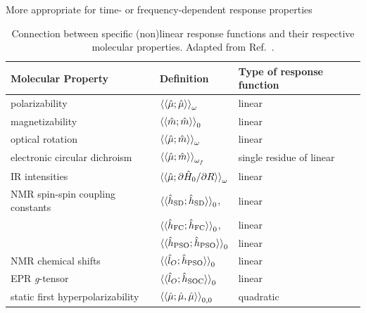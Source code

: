 \documentclass[%
class = book,%
crop = false,%
float = true,%
multi = true,%
preview = false,%
]{standalone}
\begin{document}
More appropriate for time- or frequency-dependent response properties

\begin{table}
  \centering
  \caption[Connection between specific response functions and their respective molecular properties]{Connection between specific (non)linear response functions and their respective molecular properties. Adapted from Ref.~\parencite{C1CP21951K}.\label{tab:norman}}
  \begin{tabular}{lll}
    \toprule
    \textbf{Molecular Property}       & \textbf{Definition}                                                                    & \textbf{Type of response function} \\
    \midrule
    polarizability                    & \( \braket{\braket{\hat{\mu};\hat{\mu}}}_{\omega} \)                                   & linear \\
    magnetizability                   & \( \braket{\braket{\hat{m};\hat{m}}}_{0} \)                                            & linear \\
    optical rotation                  & \( \braket{\braket{\hat{\mu};\hat{m}}}_{\omega} \)                                     & linear \\
    electronic circular dichroism     & \( \braket{\braket{\hat{\mu};\hat{m}}}_{\omega_{f}} \)                                 & single residue of linear \\
    IR intensities                    & \( \braket{\braket{\hat{\mu};\partial\hat{H}_{0}/\partial R}}_{\omega} \)              & linear \\
    NMR spin-spin coupling constants  & \( \braket{\braket{\hat{h}_{\text{SD}};\hat{h}_{\text{SD}}}}_{0} \),                   & linear \\
                                      & \( \braket{\braket{\hat{h}_{\text{FC}};\hat{h}_{\text{FC}}}}_{0} \),                   & linear \\
                                      & \( \braket{\braket{\hat{h}_{\text{PSO}};\hat{h}_{\text{PSO}}}}_{0} \)                  & linear \\
    NMR chemical shifts               & \( \braket{\braket{\hat{l}_{O};\hat{h}_{\text{PSO}}}}_{0} \)                           & linear \\
    EPR \textit{g}-tensor             & \( \braket{\braket{\hat{l}_{O};\hat{h}_{\text{SOC}}}}_{0} \)                           & linear \\
    \midrule
    static first hyperpolarizability  & \( \braket{\braket{\hat{\mu};\hat{\mu},\hat{\mu}}}_{0,0} \)                            & quadratic \\

\end{tabular}
\end{table}
\end{document}
